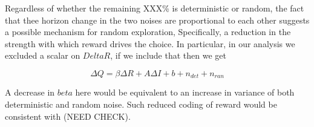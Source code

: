 \documentclass[12pt]{article}
\begin{document}
	
	
	
	Regardless of whether the remaining XXX\% is deterministic or random, the fact that thee horizon change in the two noises are proportional to each other suggests a possible mechanism for random exploration, Specifically, a reduction in the strength with which reward drives the choice. In particular, in our analysis we excluded a scalar on $Delta R$, if we include that then we get
	
	\begin{equation}
	    \Delta Q = \beta \Delta R + A \Delta I + b + n_{det} + n_{ran}
	\end{equation}
	
	A decrease in $beta$ here would be equivalent to an increase in variance of both deterministic and random noise. Such reduced coding of reward would be consistent with \cite{ebitz17} (NEED CHECK).
	
	
	
	
	

	
	
	
	
	\cleardoublepage
	\ifdefined{}
	\else
	\fi
	
\end{document}
